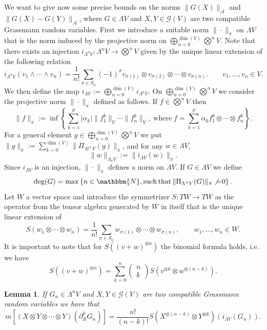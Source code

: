 \documentclass[11pt]{article}
\newcommand{\assign}{:=}
\newcommand{\tmop}[1]{\ensuremath{\operatorname{#1}}}
\newtheorem{lemma}{Lemma}
\begin{document}
We want to give now some precise bounds on the norms $\| G (X)
\|_{\mathcal{A}}$ and $\| G (X) - G (Y) \|_{\mathcal{A}}$, where $G \in
\Lambda V$ and $X, Y \in \mathcal{G} (V)$ are two compatible Grassmann random
variables. First we introduce a suitable norm $\| \cdot \|_{\pi}$ on $\Lambda
V$ that is the norm induced by the projective norm on $\bigoplus_{n = 0}^{\dim
(V)} \bigotimes^n V$. Note that there exists an injection $i_{\Lambda^n V} :
\Lambda^n V \rightarrow \bigotimes^n V$ given by the unique linear extension
of the following relation
\[ i_{\Lambda^n V} (v_1 \wedge \cdots \wedge v_n) = \frac{1}{n!} \sum_{\sigma
   \in S_n} (- 1)^{\sigma} v_{\sigma (1)} \otimes v_{\sigma (2)} \otimes
   \cdots \otimes v_{\sigma (n)} . \qquad v_1, \ldots, v_n \in V. \]
We then define the map $i_{\Lambda V} \assign \bigoplus_{n = 0}^{\dim (V)}
i_{\Lambda^n V}$. On $\bigoplus_{n = 0}^{\dim (V)} \bigotimes^n V$ we consider
the projective norm $\| \cdot \|_{\pi}$ defined as follows. If $f \in
\bigotimes^n V$ then
\[ \| f \|_{\pi} \assign \inf \left\{ \sum_{k = 1}^p | \alpha_k | \| f_1^k
   \|_V \cdots \| f^k_n \|_V, \tmop{where} f = \sum_{k = 1}^p \alpha_k f^k_1
   \otimes \cdots \otimes f^k_n \right\} . \]
For a general element $g \in \bigoplus_{n = 0}^{\dim (V)} \bigotimes^n V$ we
put $\| g \|_{\pi} \assign \sum_{k = 0}^{\dim (V)} \| \Pi_{\otimes^n V}  (g)
\|_{\pi}$, and for any $w \in \Lambda V$,
\begin{equation}
  \| w \|_{\Lambda_{\pi} V} \assign \| i_{\Lambda V} (w) \|_{\pi} .
  \label{eq:def-lambdapi-norm}
\end{equation}
Since $i_{\Lambda V}$ is an injection, $\| \cdot \|_{\pi}$ defines a norm on
$\Lambda V$. If $G \in \Lambda V$ we define
\[ \deg (G) = \max \left\{ n \in \mathbbm{N}, \tmop{such} \tmop{that} \|
   \Pi_{\Lambda^n V} (G) \|_{\pi} \not{=} 0 \right\} . \]
Let $W$ a vector space and introduce the symmetrizer $S : T W \rightarrow T W$
as the operator from the tensor algebra generated by $W$ in itself that is the
unique linear extension of
\[ S (w_1 \otimes \cdots \otimes w_n) = \frac{1}{n!} \sum_{\sigma \in S_n}
   w_{\sigma (1)} \otimes \cdots \otimes w_{\sigma (n)}, \qquad w_1, \ldots,
   w_n \in W. \]
It is important to note that for $S ((v + w)^{\otimes n})$ the binomial
formula holds, i.e. we have
\begin{equation}
  S ((v + w)^{\otimes n}) = \sum_{k = 0}^n \left( \begin{array}{c}
    n\\
    k
  \end{array} \right) S (v^{\otimes k} \otimes w^{\otimes (n - k)}) .
  \label{eq:binomialformula}
\end{equation}
\begin{lemma}
  \label{lemma_tensor}If $G_n \in \Lambda^n V$ and $X, Y \in \mathcal{G} (V)$
  are two compatible Grassmann random variables we have that
  \[ m [(X \otimes Y \otimes \cdots \otimes Y) (\partial_R^k G_n)] =
     \frac{n!}{(n - k) !} S (X^{\otimes (n - k)} \otimes Y^{\otimes k})
     (i_{\Lambda V} (G_n)) . \]
\end{lemma}
\end{document}
